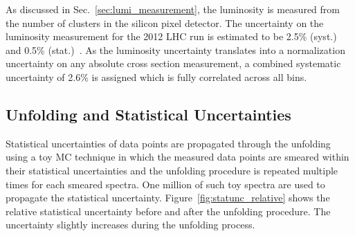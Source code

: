 As discussed in Sec.~\ref{sec:lumi_measurement}, the luminosity is measured from
the number of clusters in the silicon pixel detector. The uncertainty on the
luminosity measurement for the 2012 LHC run is estimated to be 2.5\% (syst.) and
0.5\% (stat.)~\cite{CMS-PAS-LUM-13-001}. As the luminosity uncertainty
translates into a normalization uncertainty on any absolute cross section
measurement, a combined systematic uncertainty of 2.6\% is assigned which is
fully correlated across all bins.

\subsection{Unfolding and Statistical Uncertainties}
\label{sec:stat_unf_uncert}

Statistical uncertainties of data points are propagated through the unfolding
using a toy MC technique in which the measured data points are smeared within
their statistical uncertainties and the unfolding procedure is repeated multiple
times for each smeared spectra. One million of such toy spectra are used to
propagate the statistical uncertainty. Figure~\ref{fig:statunc_relative} shows
the relative statistical uncertainty before and after the unfolding procedure.
The uncertainty slightly increases during the unfolding process.

